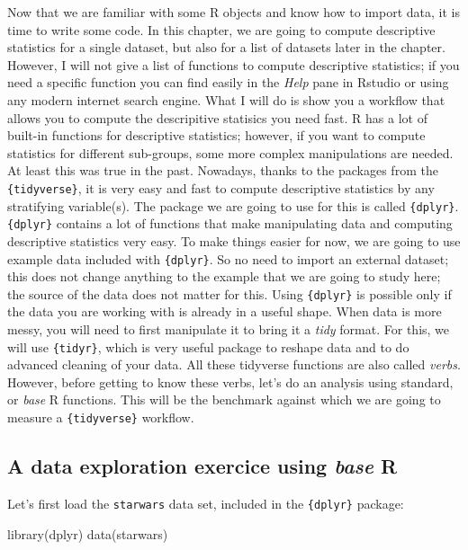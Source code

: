 \documentclass[
]{article}
\newenvironment{Shaded}{\begin{snugshade}}{\end{snugshade}}
\newcommand{\FunctionTok}[1]{\textcolor[rgb]{0.00,0.00,0.00}{#1}}
\newcommand{\NormalTok}[1]{#1}
\begin{document}
Now that we are familiar with some R objects and know how to import data, it is time to write some
code. In this chapter, we are going to compute descriptive statistics for a single dataset, but
also for a list of datasets later in the chapter. However, I will not give a list of functions to
compute descriptive statistics; if you need a specific function you can find easily in the \emph{Help}
pane in Rstudio or using any modern internet search engine. What I will do is show you a workflow
that allows you to compute the descripitive statisics you need fast. R has a lot of built-in
functions for descriptive statistics; however, if you want to compute statistics for different
sub-groups, some more complex manipulations are needed. At least this was true in the past.
Nowadays, thanks to the packages from the \texttt{\{tidyverse\}}, it is very easy and fast to compute
descriptive statistics by any stratifying variable(s). The package we are going to use for this is
called \texttt{\{dplyr\}}. \texttt{\{dplyr\}} contains a lot of functions that make manipulating data and computing
descriptive statistics very easy. To make things easier for now, we are going to use example data
included with \texttt{\{dplyr\}}. So no need to import an external dataset; this does not change anything to
the example that we are going to study here; the source of the data does not matter for this. Using
\texttt{\{dplyr\}} is possible only if the data you are working with is already in a useful shape. When data
is more messy, you will need to first manipulate it to bring it a \emph{tidy} format. For this, we will
use \texttt{\{tidyr\}}, which is very useful package to reshape data and to do advanced cleaning of your
data. All these tidyverse functions are also called \emph{verbs}. However, before getting to know these
verbs, let's do an analysis using standard, or \emph{base} R functions. This will be the benchmark
against which we are going to measure a \texttt{\{tidyverse\}} workflow.

\hypertarget{a-data-exploration-exercice-using-base-r}{%
\subsection{\texorpdfstring{A data exploration exercice using \emph{base} R}{A data exploration exercice using base R}}\label{a-data-exploration-exercice-using-base-r}}

Let's first load the \texttt{starwars} data set, included in the \texttt{\{dplyr\}} package:

\begin{Shaded}
\begin{Highlighting}[]
\FunctionTok{library}\NormalTok{(dplyr)}
\FunctionTok{data}\NormalTok{(starwars)}
\end{Highlighting}
\end{Shaded}
\end{document}
